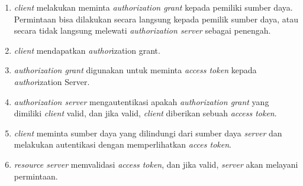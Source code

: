 \begin{enumerate}
	\item \textit{client} melakukan meminta \textit{authorization grant} kepada pemiliki sumber daya. Permintaan bisa dilakukan secara langsung kepada pemilik sumber daya, atau secara tidak langsung melewati \textit{authorization server}  sebagai penengah.
	\item \textit{client} mendapatkan \textit{author}ization grant.
	\item \textit{authorization grant} digunakan untuk meminta \textit{access token} kepada \textit{author}ization Server.
	\item \textit{authorization server}  mengautentikasi apakah \textit{authorization grant} yang dimiliki \textit{client} valid, dan jika valid, \textit{client} diberikan sebuah \textit{access token}.
	\item \textit{client} meminta sumber daya yang dilindungi dari sumber daya \textit{server}  dan melakukan autentikasi dengan memperlihatkan \textit{acces token}.
	\item \textit{resource server}  memvalidasi \textit{access token}, dan jika valid, \textit{server}  akan melayani permintaan.
\end{enumerate}

